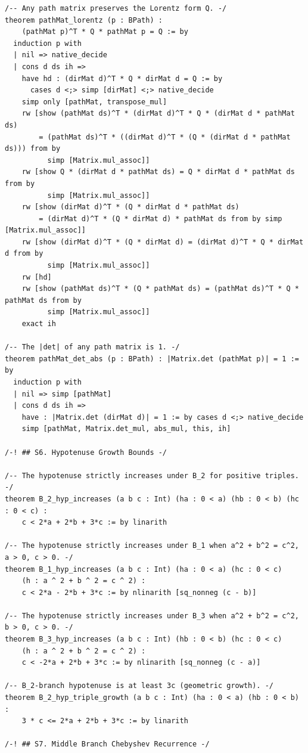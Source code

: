 \documentclass[11pt,openright,twoside]{book}
\theoremstyle{definition}
\begin{document}
\begin{lstlisting}[style=lean]
/-- Any path matrix preserves the Lorentz form Q. -/
theorem pathMat_lorentz (p : BPath) :
    (pathMat p)^T * Q * pathMat p = Q := by
  induction p with
  | nil => native_decide
  | cons d ds ih =>
    have hd : (dirMat d)^T * Q * dirMat d = Q := by
      cases d <;> simp [dirMat] <;> native_decide
    simp only [pathMat, transpose_mul]
    rw [show (pathMat ds)^T * (dirMat d)^T * Q * (dirMat d * pathMat ds)
        = (pathMat ds)^T * ((dirMat d)^T * (Q * (dirMat d * pathMat ds))) from by
          simp [Matrix.mul_assoc]]
    rw [show Q * (dirMat d * pathMat ds) = Q * dirMat d * pathMat ds from by
          simp [Matrix.mul_assoc]]
    rw [show (dirMat d)^T * (Q * dirMat d * pathMat ds)
        = (dirMat d)^T * (Q * dirMat d) * pathMat ds from by simp [Matrix.mul_assoc]]
    rw [show (dirMat d)^T * (Q * dirMat d) = (dirMat d)^T * Q * dirMat d from by
          simp [Matrix.mul_assoc]]
    rw [hd]
    rw [show (pathMat ds)^T * (Q * pathMat ds) = (pathMat ds)^T * Q * pathMat ds from by
          simp [Matrix.mul_assoc]]
    exact ih

/-- The |det| of any path matrix is 1. -/
theorem pathMat_det_abs (p : BPath) : |Matrix.det (pathMat p)| = 1 := by
  induction p with
  | nil => simp [pathMat]
  | cons d ds ih =>
    have : |Matrix.det (dirMat d)| = 1 := by cases d <;> native_decide
    simp [pathMat, Matrix.det_mul, abs_mul, this, ih]

/-! ## S6. Hypotenuse Growth Bounds -/

/-- The hypotenuse strictly increases under B_2 for positive triples. -/
theorem B_2_hyp_increases (a b c : Int) (ha : 0 < a) (hb : 0 < b) (hc : 0 < c) :
    c < 2*a + 2*b + 3*c := by linarith

/-- The hypotenuse strictly increases under B_1 when a^2 + b^2 = c^2, a > 0, c > 0. -/
theorem B_1_hyp_increases (a b c : Int) (ha : 0 < a) (hc : 0 < c)
    (h : a ^ 2 + b ^ 2 = c ^ 2) :
    c < 2*a - 2*b + 3*c := by nlinarith [sq_nonneg (c - b)]

/-- The hypotenuse strictly increases under B_3 when a^2 + b^2 = c^2, b > 0, c > 0. -/
theorem B_3_hyp_increases (a b c : Int) (hb : 0 < b) (hc : 0 < c)
    (h : a ^ 2 + b ^ 2 = c ^ 2) :
    c < -2*a + 2*b + 3*c := by nlinarith [sq_nonneg (c - a)]

/-- B_2-branch hypotenuse is at least 3c (geometric growth). -/
theorem B_2_hyp_triple_growth (a b c : Int) (ha : 0 < a) (hb : 0 < b) :
    3 * c <= 2*a + 2*b + 3*c := by linarith

/-! ## S7. Middle Branch Chebyshev Recurrence -/


\end{lstlisting}
\end{document}
